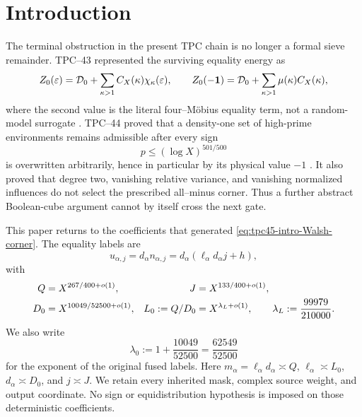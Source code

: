 \section{Introduction}
\label{sec:tpc45-introduction}

The terminal obstruction in the present TPC chain is no longer a
formal sieve remainder.  TPC--43 represented the surviving equality
energy as
\begin{equation}
 Z_0(\varepsilon)
 =\mathcal D_0+\sum_{\kappa>1}C_X(\kappa)\chi_\kappa(\varepsilon),
 \qquad
 Z_0(-\mathbf 1)
 =\mathcal D_0+\sum_{\kappa>1}\mu(\kappa)C_X(\kappa),
 \label{eq:tpc45-intro-Walsh-corner}
\end{equation}
where the second value is the literal four--M\"obius equality term,
not a random-model surrogate \citep{WangTPC43}.  TPC--44 proved that a
density-one set of high-prime environments remains admissible after
every sign
\begin{equation}
 p\le (\log X)^{501/500}
 \label{eq:tpc45-intro-old-cutoff}
\end{equation}
is overwritten arbitrarily, hence in particular by its physical value
\(-1\) \citep{WangTPC44}.  It also proved that degree two, vanishing
relative variance, and vanishing normalized influences do not select
the prescribed all--minus corner.  Thus a further abstract Boolean-cube
argument cannot by itself cross the next gate.

This paper returns to the coefficients that generated
\eqref{eq:tpc45-intro-Walsh-corner}.  The equality labels are
\begin{equation}
 u_{\alpha,j}
 =d_\alpha n_{\alpha,j}
 =d_\alpha(\ell_\alpha d_\alpha j+h),
 \label{eq:tpc45-intro-actual-label}
\end{equation}
with
\begin{align}
 Q&=X^{267/400+o(1)},
 &J&=X^{133/400+o(1)},
 \notag\\
 D_0&=X^{10049/52500+o(1)},
 &L_0:=Q/D_0
   &=X^{\lambda_L+o(1)},
   \qquad \lambda_L:=\frac{99979}{210000}.
 \label{eq:tpc45-intro-scales}
\end{align}
We also write
\begin{equation}
 \lambda_0:=1+\frac{10049}{52500}
 =\frac{62549}{52500}
 \label{eq:tpc45-intro-lambda0}
\end{equation}
for the exponent of the original fused labels.
Here \(m_\alpha=\ell_\alpha d_\alpha\asymp Q\),
\(\ell_\alpha\asymp L_0\), \(d_\alpha\asymp D_0\),
and \(j\asymp J\).  We retain every inherited mask, complex source
weight, and output coordinate.  No sign or equidistribution hypothesis
is imposed on those deterministic coefficients.


